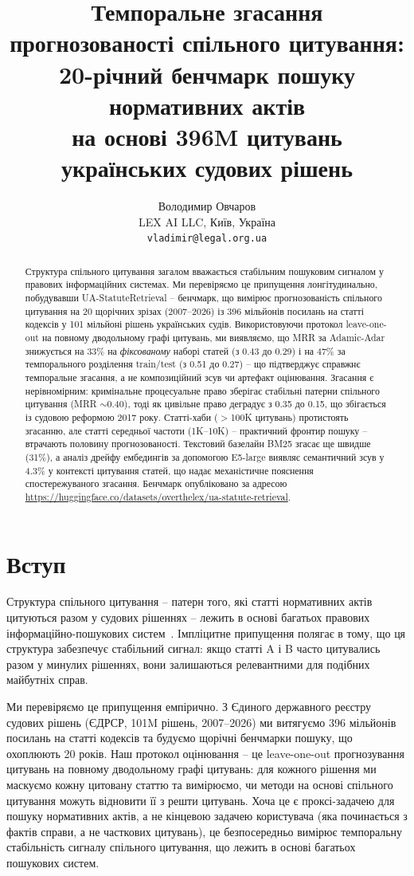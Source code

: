 \documentclass[11pt]{article}
\title{Темпоральне згасання прогнозованості спільного цитування:\\20-річний бенчмарк пошуку нормативних актів\\на основі 396M цитувань українських судових рішень}
\author{
  Володимир Овчаров \\[6pt]
  LEX AI LLC, Київ, Україна \\[4pt]
  \texttt{vladimir@legal.org.ua}
}
\date{}
\begin{document}
\maketitle

\begin{abstract}
Структура спільного цитування загалом вважається стабільним пошуковим сигналом у правових інформаційних системах.
Ми перевіряємо це припущення лонгітудинально, побудувавши UA-StatuteRetrieval – бенчмарк, що вимірює прогнозованість спільного цитування на 20 щорічних зрізах (2007–2026) із 396 мільйонів посилань на статті кодексів у 101 мільйоні рішень українських судів.
Використовуючи протокол leave-one-out на повному дводольному графі цитувань, ми виявляємо, що MRR за Adamic-Adar знижується на 33\% на \emph{фіксованому} наборі статей (з 0.43 до 0.29) і на 47\% за темпорального розділення train/test (з 0.51 до 0.27) – що підтверджує справжнє темпоральне згасання, а не композиційний зсув чи артефакт оцінювання.
Згасання є нерівномірним: кримінальне процесуальне право зберігає стабільні патерни спільного цитування (MRR $\sim$0.40), тоді як цивільне право деградує з 0.35 до 0.15, що збігається із судовою реформою 2017 року.
Статті-хаби ($>$100K цитувань) протистоять згасанню, але статті середньої частоти (1K–10K) – практичний фронтир пошуку – втрачають половину прогнозованості.
Текстовий базелайн BM25 згасає ще швидше (31\%), а аналіз дрейфу ембедингів за допомогою E5-large виявляє семантичний зсув у 4.3\% у контексті цитування статей, що надає механістичне пояснення спостережуваного згасання.
Бенчмарк опубліковано за адресою \url{https://huggingface.co/datasets/overthelex/ua-statute-retrieval}.
\end{abstract}

\section{Вступ}
\label{sec:intro}

Структура спільного цитування – патерн того, які статті нормативних актів цитуються разом у судових рішеннях – лежить в основі багатьох правових інформаційно-пошукових систем~\citep{tang2024casegnn,ho2025incorporating,barron2025bridging}.
Імпліцитне припущення полягає в тому, що ця структура забезпечує стабільний сигнал: якщо статті A і B часто цитувались разом у минулих рішеннях, вони залишаються релевантними для подібних майбутніх справ.

Ми перевіряємо це припущення емпірично.
З Єдиного державного реєстру судових рішень (ЄДРСР, 101M рішень, 2007–2026) ми витягуємо 396 мільйонів посилань на статті кодексів та будуємо щорічні бенчмарки пошуку, що охоплюють 20 років.
Наш протокол оцінювання – це leave-one-out прогнозування цитувань на повному дводольному графі цитувань: для кожного рішення ми маскуємо кожну цитовану статтю та вимірюємо, чи методи на основі спільного цитування можуть відновити її з решти цитувань.
Хоча це є проксі-задачею для пошуку нормативних актів, а не кінцевою задачею користувача (яка починається з фактів справи, а не часткових цитувань), це безпосередньо вимірює темпоральну стабільність сигналу спільного цитування, що лежить в основі багатьох пошукових систем.
\end{document}
